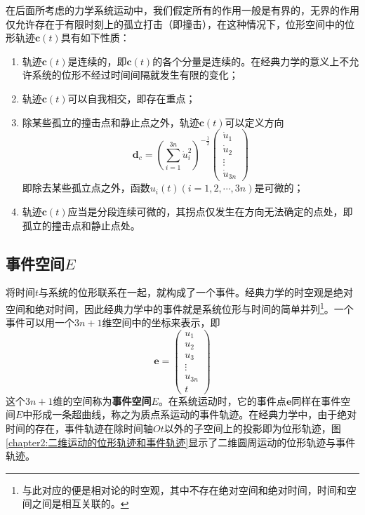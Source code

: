在后面所考虑的力学系统运动中，我们假定所有的作用一般是有界的，无界的作用仅允许存在于有限时刻上的孤立打击（即撞击），在这种情况下，位形空间中的位形轨迹$\boldsymbol{c}(t)$具有如下性质：
\begin{enumerate}
    \item 轨迹$\boldsymbol{c}(t)$是连续的，即$\boldsymbol{c}(t)$的各个分量是连续的。在经典力学的意义上不允许系统的位形不经过时间间隔就发生有限的变化；
    \item 轨迹$\boldsymbol{c}(t)$可以自我相交，即存在重点；
    \item 除某些孤立的撞击点和静止点之外，轨迹$\boldsymbol{c}(t)$可以定义方向
    \begin{equation}
        \boldsymbol{d}_c = \left(\sum_{i=1}^{3n}\dot{u}_i^2\right)^{-\frac12}\begin{pmatrix}
            \dot{u}_1 \\ \dot{u}_2 \\ \vdots \\ \dot{u}_{3n}
        \end{pmatrix}
    \end{equation}
    即除去某些孤立点之外，函数$u_i(t)(i=1,2,\cdots,3n)$是可微的；
    \item 轨迹$\boldsymbol{c}(t)$应当是分段连续可微的，其拐点仅发生在方向无法确定的点处，即孤立的撞击点和静止点处。
\end{enumerate}

\subsection{事件空间$E$}

将时间$t$与系统的位形联系在一起，就构成了一个事件。经典力学的时空观是绝对空间和绝对时间，因此经典力学中的事件就是系统位形与时间的简单并列\footnote{与此对应的便是相对论的时空观，其中不存在绝对空间和绝对时间，时间和空间之间是相互关联的。}。一个事件可以用一个$3n+1$维空间中的坐标来表示，即
\begin{equation}
    \boldsymbol{e} = \begin{pmatrix}
        u_1 \\ u_2 \\ u_3 \\ \vdots \\ u_{3n} \\ t
    \end{pmatrix}
\end{equation}
这个$3n+1$维的空间称为{\bf 事件空间}$E$。在系统运动时，它的事件点$\boldsymbol{e}$同样在事件空间$E$中形成一条超曲线，称之为质点系运动的事件轨迹。在经典力学中，由于绝对时间的存在，事件轨迹在除时间轴$Ot$以外的子空间上的投影即为位形轨迹，图\ref{chapter2:二维运动的位形轨迹和事件轨迹}显示了二维圆周运动的位形轨迹与事件轨迹。

